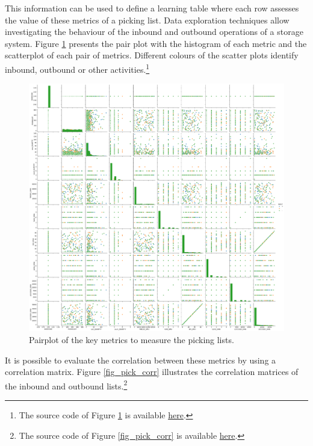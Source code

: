 This information can be used to define a learning table where each row assesses the value of these metrics of a picking list. Data exploration techniques allow investigating the behaviour of the inbound and outbound operations of a storage system. Figure \ref{fig_pick_pairplot} presents the pair plot with the histogram of each metric and the scatterplot of each pair of metrics. Different colours of the scatter plots identify inbound, outbound or other activities.\footnote{The source code of Figure \ref{fig_pick_pairplot} is available \href{https://github.com/aletuf93/logproj/blob/master/examples/WH_05\%20Warehouse\%20key\%20variables\%20exploration.ipynb}{here}.}

\begin{figure}[hbt!]
\centering
\includegraphics[width=1.0\textwidth]{SectionWarehouses/control_figures/fig_pick_pairplot.png}
\captionsetup{type=figure}
\caption{Pairplot of the key metrics to measure the picking lists.}
\label{fig_pick_pairplot}
\end{figure}

It is possible to evaluate the correlation between these metrics by using a correlation matrix. Figure \ref{fig_pick_corr} illustrates the correlation matrices of the inbound and outbound lists.\footnote{The source code of Figure \ref{fig_pick_corr} is available \href{https://github.com/aletuf93/logproj/blob/master/examples/WH_05\%20Warehouse\%20key\%20variables\%20exploration.ipynb}{here}.}

